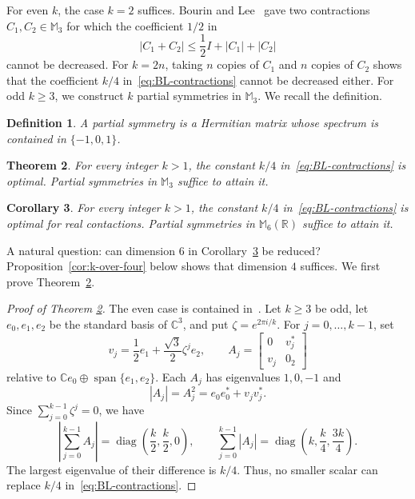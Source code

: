 \documentclass[11pt]{amsart}
\numberwithin{equation}{section}
\newtheorem{theorem}{Theorem}[section]
\newtheorem{corollary}[theorem]{Corollary}
\newtheorem{definition}[theorem]{Definition}
\newcommand{\bR}{\mathbb{R}}
\newcommand{\diag}{\operatorname{diag}}
\begin{document}
For even $k$, the case $k=2$ suffices. Bourin and
Lee~\cite[Corollary~4.4]{BourinLee2024} gave two contractions
$C_1,C_2\in\mathbb M_3$ for which the coefficient $1/2$ in
\[
 |C_1+C_2|\leq\frac12 I+|C_1|+|C_2|
\]
cannot be decreased. For $k=2n$, taking $n$ copies of $C_1$
and $n$ copies of $C_2$ shows that the coefficient $k/4$
in~\eqref{eq:BL-contractions} cannot be decreased either.
For odd $k\geq3$, we construct $k$ partial symmetries in
$\mathbb M_3$. We recall the definition.

\begin{definition}
A partial symmetry is a Hermitian matrix whose spectrum
is contained in $\{-1,0,1\}$.
\end{definition}


\begin{theorem}\label{thm:k-over-four}
For every integer $k>1$, the constant $k/4$ in~\eqref{eq:BL-contractions} is optimal. Partial symmetries in $\mathbb M_3$ suffice to attain it.
\end{theorem}

\begin{corollary}\label{corthm2.2}
For every integer $k>1$, the constant $k/4$ in~\eqref{eq:BL-contractions} is optimal for real contactions. Partial symmetries in $\mathbb M_6(\bR)$ suffice to attain it.
\end{corollary}

A natural question: can dimension $6$ in Corollary~\ref{corthm2.2} be reduced?
Proposition~\ref{cor:k-over-four} below shows that
dimension $4$ suffices. We first prove
Theorem~\ref{thm:k-over-four}.



\begin{proof}[Proof of Theorem \ref{thm:k-over-four}]
The even case is contained in~\cite[Corollary~4.4]{BourinLee2024}. Let $k\geq3$ be odd, let $e_0,e_1,e_2$ be the standard basis of $\mathbb C^3$, and put $\zeta=e^{2\pi i/k}$. For $j=0,\ldots,k-1$, set
\[
 v_j=\frac12e_1+\frac{\sqrt3}{2}\zeta^j e_2,
 \qquad
 A_j=\begin{bmatrix}0&v_j^*\\v_j&0_2\end{bmatrix}
\]
relative to $\mathbb C e_0\oplus\operatorname{span}\{e_1,e_2\}$. Each $A_j$ has eigenvalues $1,0,-1$ and
\[
 |A_j|=A_j^2=e_0e_0^*+v_jv_j^*.
\]
Since $\sum_{j=0}^{k-1}\zeta^j=0$, we have
\[
 \left|\sum_{j=0}^{k-1}A_j\right|
 =\diag\left(\frac k2,\frac k2,0\right),
 \qquad
 \sum_{j=0}^{k-1}|A_j|
 =\diag\left(k,\frac k4,\frac{3k}{4}\right).
\]
The largest eigenvalue of their difference is $k/4$. Thus, no smaller scalar can replace $k/4$ in~\eqref{eq:BL-contractions}.
\end{proof}
\end{document}
